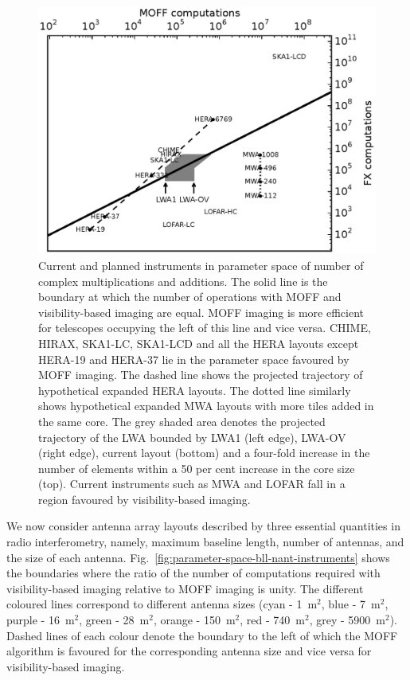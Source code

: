\documentclass[a4paper,fleqn,usenatbib]{mnras}
\begin{document}
\begin{figure}
  \includegraphics[width=\columnwidth]{figure11}
  \caption{Current and planned instruments in parameter space of number of complex multiplications and additions. The solid line is the boundary at which the number of operations with MOFF and visibility-based imaging are equal. MOFF imaging is more efficient for telescopes occupying the left of this line and vice versa. CHIME, HIRAX, SKA1-LC, SKA1-LCD and all the HERA layouts except HERA-19 and HERA-37 lie in the parameter space favoured by MOFF imaging. The dashed line shows the projected trajectory of hypothetical expanded HERA layouts. The dotted line similarly shows hypothetical expanded MWA layouts with more tiles added in the same core. The grey shaded area denotes the projected trajectory of the LWA bounded by LWA1 (left edge), LWA-OV (right edge), current layout (bottom) and a four-fold increase in the number of elements within a 50 per cent increase in the core size (top). Current instruments such as MWA and LOFAR fall in a region favoured by visibility-based imaging.}
  \label{fig:parameter-space-computations-instruments}
\end{figure}

We now consider antenna array layouts described by three essential quantities in radio interferometry, namely, maximum baseline length, number of antennas, and the size of each antenna. Fig.~\ref{fig:parameter-space-bll-nant-instruments} shows the boundaries where the ratio of the number of computations required with visibility-based imaging relative to MOFF imaging is unity. The different coloured lines correspond to different antenna sizes (cyan - 1~m$^2$, blue - 7~m$^2$, purple - 16~m$^2$, green - 28~m$^2$, orange - 150~m$^2$, red - 740~m$^2$, grey - 5900~m$^2$). Dashed lines of each colour denote the boundary to the left of which the MOFF algorithm is favoured for the corresponding antenna size and vice versa for visibility-based imaging.
\end{document}
